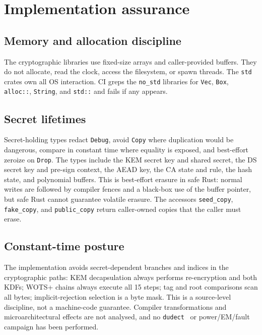 \documentclass[runningheads]{llncs}
\begin{document}
\section{Implementation assurance}
\label{sec:implementation}

\subsection{Memory and allocation discipline}

The cryptographic libraries use fixed-size arrays and caller-provided
buffers.  They do not allocate, read the clock, access the filesystem,
or spawn threads.  The \texttt{std} crates own all OS interaction.  CI
greps the \texttt{no\_std} libraries for \texttt{Vec}, \texttt{Box},
\texttt{alloc::}, \texttt{String}, and \texttt{std::} and fails if any
appears.

\subsection{Secret lifetimes}

Secret-holding types redact \texttt{Debug}, avoid \texttt{Copy} where
duplication would be dangerous, compare in constant time where equality
is exposed, and best-effort zeroize on \texttt{Drop}.  The types include
the KEM secret key and shared secret, the DS secret key and pre-sign
context, the AEAD key, the CA state and rule, the hash state, and
polynomial buffers.  This is best-effort erasure in safe Rust: normal
writes are followed by compiler fences and a black-box use of the
buffer pointer, but safe Rust cannot guarantee volatile erasure.  The
accessors \texttt{seed\_copy}, \texttt{fake\_copy}, and
\texttt{public\_copy} return caller-owned copies that the caller must
erase.

\subsection{Constant-time posture}

The implementation avoids secret-dependent branches and indices in the
cryptographic paths: KEM decapsulation always performs re-encryption and
both KDFs; WOTS+ chains always execute all 15 steps; tag and root
comparisons scan all bytes; implicit-rejection selection is a byte mask.
This is a source-level discipline, not a machine-code guarantee.
Compiler transformations and microarchitectural effects are not
analysed, and no \texttt{dudect}~\cite{dudect} or power/EM/fault
campaign has been performed.
\end{document}
